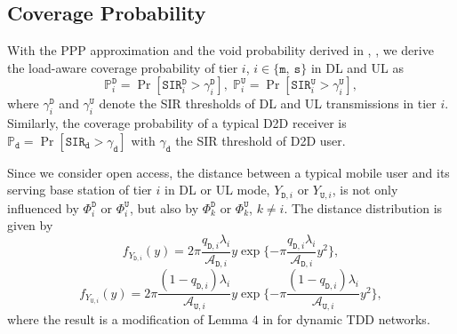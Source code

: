\documentclass[twocolumn,english]{IEEEtran}
\theoremstyle{plain}
\theoremstyle{definition}
\begin{document}
\subsection{Coverage Probability}

With the PPP approximation and the void probability derived in ,
, we derive the load-aware coverage probability
of tier $i$, $i\in\{\mathtt{m},\:\mathtt{s}\}$ in DL and UL as
\begin{equation}
\mathbb{P}_{i}^{\mathtt{D}}=\Pr[\mathtt{SIR}_{i}^{\mathtt{D}}>\gamma_{i}^{\mathtt{D}}],\;\mathbb{P}_{i}^{\mathtt{U}}=\Pr[\mathtt{SIR}_{i}^{\mathtt{U}}>\gamma_{i}^{\mathtt{U}}],\label{eq:macro coverage}
\end{equation}
where $\gamma_{i}^{\mathtt{D}}$ and $\gamma_{i}^{\mathtt{U}}$ denote
the SIR thresholds of DL and UL transmissions in tier $i$. Similarly,
the coverage probability of a typical D2D receiver is $\mathbb{P}_{\mathtt{d}}=\Pr[\mathtt{SIR}_{\mathtt{d}}>\gamma_{\mathtt{d}}]$
with $\gamma_{\mathtt{d}}$ the SIR threshold of D2D user.

Since we consider open access, the distance between a typical mobile
user and its serving base station of tier $i$ in DL or UL mode, $Y_{\mathtt{D},i}$
or $Y_{\mathtt{U},i}$, is not only influenced by $\Phi_{i}^{\mathtt{D}}$
or $\Phi_{i}^{\mathtt{U}}$, but also by $\Phi_{k}^{\mathtt{D}}$
or $\Phi_{k}^{\mathtt{U}}$, $k\neq i$. The distance distribution
is given by
\begin{equation}
f_{Y_{\mathtt{D},i}}(y)=2\pi\frac{q_{\mathtt{D},i}\lambda_{i}}{\mathcal{A}_{\mathtt{D},i}}y\exp\{-\pi\frac{q_{\mathtt{D},i}\lambda_{i}}{\mathcal{A}_{\mathtt{D},i}}y^{2}\},\label{eq:Dis_PDF_DL}
\end{equation}
\begin{equation}
f_{Y_{\mathtt{U},i}}(y)=2\pi\frac{\left(1-q_{\mathtt{D},i}\right)\lambda_{i}}{\mathcal{A}_{\mathtt{U},i}}y\exp\{-\pi\frac{\left(1-q_{\mathtt{D},i}\right)\lambda_{i}}{\mathcal{A}_{\mathtt{U},i}}y^{2}\},\label{eq:Dis_PDF_UL}
\end{equation}
where the result is a modification of Lemma 4 in \cite{HCNW} for
dynamic TDD networks.
\end{document}
